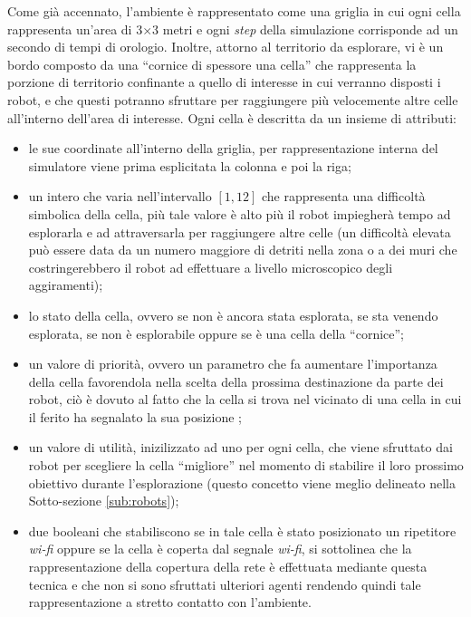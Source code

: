 Come già accennato, l'ambiente è rappresentato come una griglia in cui ogni cella rappresenta un'area di 3$\times$3 metri e ogni \textit{step} della simulazione corrisponde ad un secondo di tempi di orologio.
Inoltre, attorno al territorio da esplorare, vi è un bordo composto da una “cornice di spessore una cella” che rappresenta la porzione di territorio confinante a quello di interesse in cui verranno disposti i robot, e che questi potranno sfruttare per raggiungere più velocemente altre celle all'interno dell'area di interesse.
Ogni cella è descritta da un insieme di attributi:
\begin{itemize}
	\item le sue coordinate all'interno della griglia, per rappresentazione interna del simulatore viene prima esplicitata la colonna e poi la riga;
	\item un intero che varia nell'intervallo $\left[1, 12\right]$ che rappresenta una difficoltà simbolica della cella, più tale valore è alto più il robot impiegherà tempo ad esplorarla e ad attraversarla per raggiungere altre celle (un difficoltà elevata può essere data da un numero maggiore di detriti nella zona o a dei muri che costringerebbero il robot ad effettuare a livello microscopico degli aggiramenti);
	\item lo stato della cella, ovvero se non è ancora stata esplorata, se sta venendo esplorata, se non è esplorabile oppure se è una cella della “cornice”;
	\item un valore di priorità, ovvero un parametro che fa aumentare l'importanza della cella favorendola nella scelta della prossima destinazione da parte dei robot, ciò è dovuto al fatto che la cella si trova nel vicinato di una cella in cui il ferito ha segnalato la sua posizione ;
	\item un valore di utilità, inizilizzato ad uno per ogni cella, che viene sfruttato dai robot per scegliere la cella “migliore” nel momento di stabilire il loro prossimo obiettivo durante l'esplorazione (questo concetto viene meglio delineato nella Sotto-sezione \ref{sub:robots});
	\item due booleani che stabiliscono se in tale cella è stato posizionato un ripetitore \textit{wi-fi} oppure se la cella è coperta dal segnale \textit{wi-fi}, si sottolinea che la rappresentazione della copertura della rete è effettuata mediante questa tecnica e che non si sono sfruttati ulteriori agenti rendendo quindi tale rappresentazione a stretto contatto con l'ambiente.
\end{itemize}

